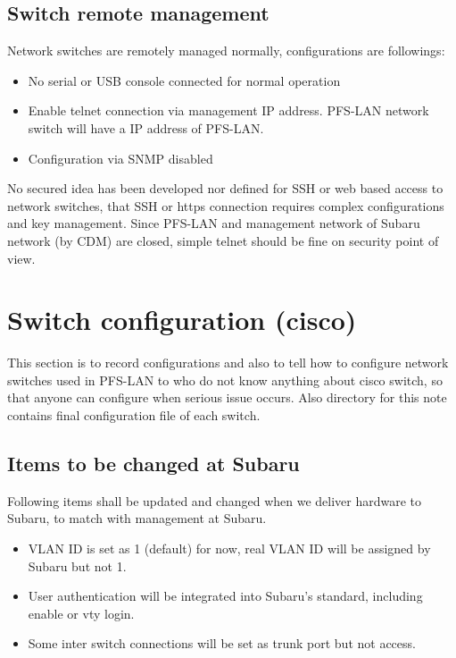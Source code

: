 \documentclass[a4paper,notitlepage]{article}
\begin{document}
\subsection{Switch remote management}

Network switches are remotely managed normally, configurations are followings: 

\begin{itemize}
  \item No serial or USB console connected for normal operation
  \item Enable telnet connection via management IP address. PFS-LAN network 
    switch will have a IP address of PFS-LAN.
  \item Configuration via SNMP disabled
\end{itemize}

No secured idea has been developed nor defined for SSH or web based access to 
network switches, that SSH or https connection requires complex configurations 
and key management. Since PFS-LAN and management network of Subaru network (by 
CDM) are closed, simple telnet should be fine on security point of view.

\section{Switch configuration (cisco)}

This section is to record configurations and also to tell how to configure 
network switches used in PFS-LAN to who do not know anything about cisco 
switch, so that anyone can configure when serious issue occurs. 
Also directory for this note contains final configuration file of each 
switch.

\subsection{Items to be changed at Subaru}

Following items shall be updated and changed when we deliver hardware to 
Subaru, to match with management at Subaru. 

\begin{itemize}
  \item VLAN ID is set as 1 (default) for now, real VLAN ID will be assigned 
    by Subaru but not 1.
  \item User authentication will be integrated into Subaru's standard, 
    including enable or vty login.
  \item Some inter switch connections will be set as trunk port but not access.
\end{itemize}
\end{document}
